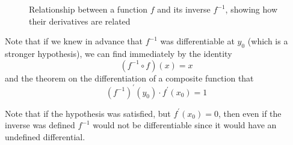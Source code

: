 \begin{theorem}
\begin{figure}[H]
      \caption{Relationship between a function $f$ and its inverse $f^{-1}$, showing how their derivatives are related}
      \label{fig:function-inverse}
    \end{figure}

    Note that if we knew in advance that $f^{-1}$ was differentiable at $y_0$ (which is a stronger hypothesis), we can find immediately by the identity 
    \[(f^{-1} \circ f) (x) = x\]  
    and the theorem on the differentiation of a composite function that
    \[(f^{-1})^\prime (y_0) \cdot f^\prime (x_0) = 1\]
    \end{theorem}

    Note that if the hypothesis was satisfied, but $f^\prime (x_0) = 0$, then even if the inverse was defined $f^{-1}$ would not be differentiable since it would have an undefined differential. 

